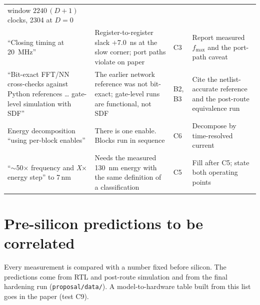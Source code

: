 \documentclass[10pt]{article}
\begin{document}
{\begin{longtable}{@{}L{4.5cm}L{4.3cm}L{1.6cm}L{4.6cm}@{}}
window $2240\,(D+1)$ clocks, \num{2304} at $D=0$\\\addlinespace[2pt]
``Closing timing at \SI{20}{\mega\hertz}'' & Register-to-register slack
$+$\SI{7.0}{\nano\second} at the slow corner; port paths violate on
paper & C3 & Report measured $f_{\max}$ and the port-path caveat\\\addlinespace[2pt]
``Bit-exact FFT/NN cross-checks against Python references \ldots
gate-level simulation with SDF'' & The earlier network reference was not
bit-exact; gate-level runs are functional, not SDF & B2, B3 & Cite the
netlist-accurate reference and the post-route equivalence run\\\addlinespace[2pt]
Energy decomposition ``using per-block enables'' & There is one enable.
Blocks run in sequence & C6 & Decompose by time-resolved current\\\addlinespace[2pt]
``$\sim$50$\times$ frequency and \textit{X}$\times$ energy step'' to
7\,nm & Needs the measured \SI{130}{\nano\metre} energy with the same
definition of a classification & C5 & Fill after C5; state both
operating points\\
\bottomrule
\end{longtable}}

\section{Pre-silicon predictions to be correlated}
\label{sec:pred}
Every measurement is compared with a number fixed before silicon. The
predictions come from RTL and post-route simulation and from the final
hardening run (\texttt{proposal/data/}). A model-to-hardware table built
from this list goes in the paper (test C9).
\end{document}
